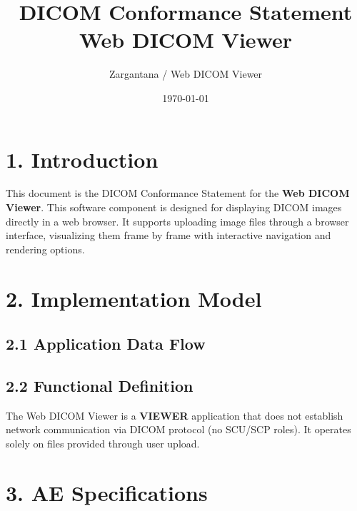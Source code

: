 \documentclass[11pt]{article}
\title{DICOM Conformance Statement \\ Web DICOM Viewer}
\author{Zargantana / Web DICOM Viewer}
\date{\today}
\begin{document}
\maketitle

\section*{1. Introduction}

This document is the DICOM Conformance Statement for the \textbf{Web DICOM Viewer}. This software component is designed for displaying DICOM images directly in a web browser. It supports uploading image files through a browser interface, visualizing them frame by frame with interactive navigation and rendering options.

\section*{2. Implementation Model}

\subsection*{2.1 Application Data Flow}

\begin{center}
\end{center}

\subsection*{2.2 Functional Definition}
The Web DICOM Viewer is a \textbf{VIEWER} application that does not establish network communication via DICOM protocol (no SCU/SCP roles). It operates solely on files provided through user upload.

\section*{3. AE Specifications}
\end{document}
